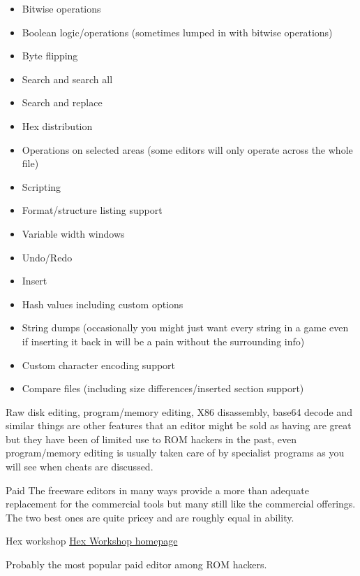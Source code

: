 \documentclass[
]{book}
\providecommand{\tightlist}{%
  \setlength{\itemsep}{0pt}\setlength{\parskip}{0pt}}
\begin{document}
\begin{itemize}
\tightlist
\item
  Bitwise operations
\item
  Boolean logic/operations (sometimes lumped in with bitwise operations)
\item
  Byte flipping
\item
  Search and search all
\item
  Search and replace
\item
  Hex distribution
\item
  Operations on selected areas (some editors will only operate across the whole file)
\item
  Scripting
\item
  Format/structure listing support
\item
  Variable width windows
\item
  Undo/Redo
\item
  Insert
\item
  Hash values including custom options
\item
  String dumps (occasionally you might just want every string in a game even if inserting it back in will be a pain without the surrounding info)
\item
  Custom character encoding support
\item
  Compare files (including size differences/inserted section support)
\end{itemize}

Raw disk editing, program/memory editing, X86 disassembly, base64 decode and similar things are other features that an editor might be sold as having are great but they have been of limited use to ROM hackers in the past, even program/memory editing is usually taken care of by specialist programs as you will see when cheats are discussed.

Paid The freeware editors in many ways provide a more than adequate replacement for the commercial tools but many still like the commercial offerings. The two best ones are quite pricey and are roughly equal in ability.

Hex workshop \href{http://www.hexworkshop.com/}{Hex Workshop homepage}

Probably the most popular paid editor among ROM hackers.
\end{document}
